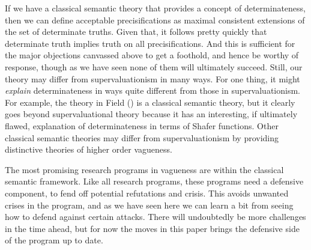 \documentclass[
  11pt,
  letterpaper,
  DIV=11,
  numbers=noendperiod,
  oneside]{scrartcl}
\begin{document}
If we have a classical semantic theory that provides a concept of
determinateness, then we can define acceptable precisifications as
maximal consistent extensions of the set of determinate truths. Given
that, it follows pretty quickly that determinate truth implies truth on
all precisifications. And this is sufficient for the major objections
canvassed above to get a foothold, and hence be worthy of response,
though as we have seen none of them will ultimately succeed. Still, our
theory may differ from supervaluationism in many ways. For one thing, it
might \emph{explain} determinateness in ways quite different from those
in supervaluationism. For example, the theory in Field
() is a classical semantic
theory,
but it clearly goes beyond supervaluational theory because it has an
interesting, if ultimately flawed, explanation of determinateness in
terms of Shafer functions. Other classical semantic theories may differ
from supervaluationism by providing distinctive theories of higher order
vagueness.

The most promising research programs in vagueness are within the
classical semantic framework. Like all research programs, these programs
need a defensive component, to fend off potential refutations and
crisis. This avoids unwanted crises in the program, and as we have seen
here we can learn a bit from seeing how to defend against certain
attacks. There will undoubtedly be more challenges in the time ahead,
but for now the moves in this paper brings the defensive side of the
program up to date.
\end{document}
